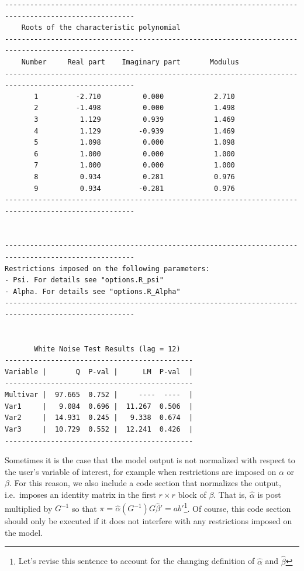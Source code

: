 \documentclass[article]{jss}
\begin{document}
\begin{verbatim}
-----------------------------------------------------------------------------------------------------
    Roots of the characteristic polynomial                                                           
-----------------------------------------------------------------------------------------------------
    Number     Real part    Imaginary part       Modulus                                             
-----------------------------------------------------------------------------------------------------
       1         -2.710          0.000            2.710                                        
       2         -1.498          0.000            1.498                                        
       3          1.129          0.939            1.469                                        
       4          1.129         -0.939            1.469                                        
       5          1.098          0.000            1.098                                        
       6          1.000          0.000            1.000                                        
       7          1.000          0.000            1.000                                        
       8          0.934          0.281            0.976                                        
       9          0.934         -0.281            0.976                                        
-----------------------------------------------------------------------------------------------------


-----------------------------------------------------------------------------------------------------
Restrictions imposed on the following parameters:
- Psi. For details see "options.R_psi"
- Alpha. For details see "options.R_Alpha"
-----------------------------------------------------------------------------------------------------


       White Noise Test Results (lag = 12)
---------------------------------------------
Variable |       Q  P-val |      LM  P-val  |
---------------------------------------------
Multivar |  97.665  0.752 |     ----  ----  |
Var1     |   9.084  0.696 |  11.267  0.506  |
Var2     |  14.931  0.245 |   9.338  0.674  |
Var3     |  10.729  0.552 |  12.241  0.426  |
---------------------------------------------
\end{verbatim}

Sometimes it is the case that the model output is not normalized with respect to the user's variable of interest, for example when restrictions are imposed on $\alpha$ or $\beta$. For this reason, we also include a code section that normalizes the output, i.e.\ imposes an identity matrix in the first $r \times r$ block of $\beta$. 
That is, $\hat{\alpha}$ is post multiplied by $G^{-1}$ so that $\pi= \hat{\alpha}(G^{-1})G\hat{\beta}' = ab'$\footnote{Let's revise this sentence to account for the changing definition of $\hat{\alpha}$ and $\hat{\beta}$}.
Of course, this code section should only be executed if it does not interfere with any restrictions imposed on the model.
\end{document}
